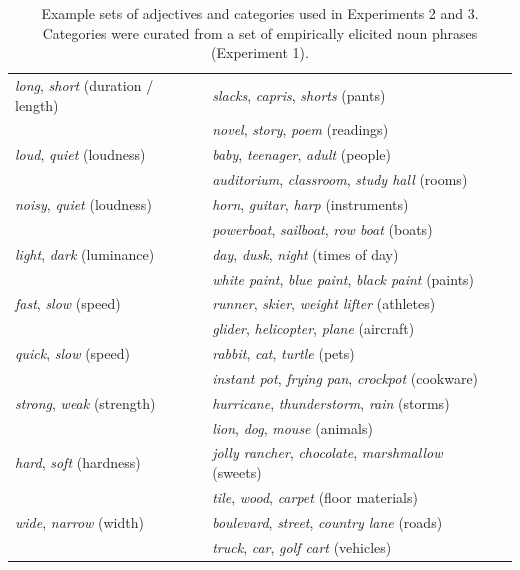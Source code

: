 \documentclass[doc]{apa6}
\begin{document}
\begin{table}[ht]
\begin{tabularx}{\textwidth}{lll}
  \emph{long}, \emph{short} (duration / length) & \emph{slacks}, \emph{capris}, \emph{shorts} (pants) \\ 
								  & \emph{novel}, \emph{story}, \emph{poem} (readings) \\ 
  \emph{loud}, \emph{quiet} (loudness) &   \emph{baby}, \emph{teenager}, \emph{adult} (people) \\ 
							  &  \emph{auditorium}, \emph{classroom},   \emph{study hall} (rooms) \\ 
 \emph{noisy}, \emph{quiet} (loudness) &  \emph{horn}, \emph{guitar}, \emph{harp} (instruments) \\  
							 &  \emph{powerboat}, \emph{sailboat}, \emph{row boat}  (boats) \\  
  \emph{light}, \emph{dark} (luminance) & \emph{day}, \emph{dusk}, \emph{night}  (times of day) \\  
								  & \emph{white paint}, \emph{blue paint}, \emph{black paint}  (paints) \\  
   \emph{fast}, \emph{slow} (speed)   &  \emph{runner}, \emph{skier}, \emph{weight lifter} (athletes) \\
								  &  \emph{glider}, \emph{helicopter}, \emph{plane} (aircraft) \\
  \emph{quick}, \emph{slow} (speed) &  \emph{rabbit}, \emph{cat}, \emph{turtle} (pets) \\
							  &  \emph{instant pot}, \emph{frying pan}, \emph{crockpot} (cookware) \\
  \emph{strong}, \emph{weak} (strength) &  \emph{hurricane}, \emph{thunderstorm}, \emph{rain} (storms)\\
						  &  \emph{lion}, \emph{dog}, \emph{mouse} (animals)\\
  \emph{hard}, \emph{soft} (hardness) &  \emph{jolly rancher}, \emph{chocolate}, \emph{marshmallow} (sweets)\\
							  &  \emph{tile}, \emph{wood}, \emph{carpet} (floor materials)\\
  \emph{wide}, \emph{narrow} (width) & \emph{boulevard}, \emph{street}, \emph{country lane} (roads) \\
							  & \emph{truck}, \emph{car}, \emph{golf cart} (vehicles) \\
   \hline
\end{tabularx}
\caption{Example sets of adjectives and categories used in Experiments 2 and 3. 
Categories were curated from a set of empirically elicited noun phrases (Experiment 1).} 
\label{tab:1}
\endgroup
\end{table}
\end{document}

